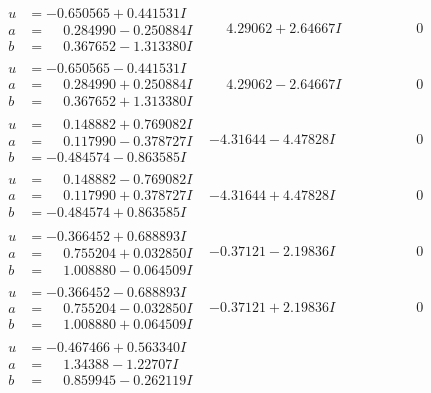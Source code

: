 \documentclass[1p]{elsarticle_modified}
\theoremstyle{definition}
\begin{document}
$$\begin{array}{c|c|c}
\begin{aligned}
u &= -0.650565 + 0.441531 I \\
a &= \phantom{-}0.284990 - 0.250884 I \\
b &= \phantom{-}0.367652 - 1.313380 I\end{aligned}
 & \phantom{-}4.29062 + 2.64667 I & \phantom{-0.000000 } 0 \\ \hline\begin{aligned}
u &= -0.650565 - 0.441531 I \\
a &= \phantom{-}0.284990 + 0.250884 I \\
b &= \phantom{-}0.367652 + 1.313380 I\end{aligned}
 & \phantom{-}4.29062 - 2.64667 I & \phantom{-0.000000 } 0 \\ \hline\begin{aligned}
u &= \phantom{-}0.148882 + 0.769082 I \\
a &= \phantom{-}0.117990 - 0.378727 I \\
b &= -0.484574 - 0.863585 I\end{aligned}
 & -4.31644 - 4.47828 I & \phantom{-0.000000 } 0 \\ \hline\begin{aligned}
u &= \phantom{-}0.148882 - 0.769082 I \\
a &= \phantom{-}0.117990 + 0.378727 I \\
b &= -0.484574 + 0.863585 I\end{aligned}
 & -4.31644 + 4.47828 I & \phantom{-0.000000 } 0 \\ \hline\begin{aligned}
u &= -0.366452 + 0.688893 I \\
a &= \phantom{-}0.755204 + 0.032850 I \\
b &= \phantom{-}1.008880 - 0.064509 I\end{aligned}
 & -0.37121 - 2.19836 I & \phantom{-0.000000 } 0 \\ \hline\begin{aligned}
u &= -0.366452 - 0.688893 I \\
a &= \phantom{-}0.755204 - 0.032850 I \\
b &= \phantom{-}1.008880 + 0.064509 I\end{aligned}
 & -0.37121 + 2.19836 I & \phantom{-0.000000 } 0 \\ \hline\begin{aligned}
u &= -0.467466 + 0.563340 I \\
a &= \phantom{-}1.34388 - 1.22707 I \\
b &= \phantom{-}0.859945 - 0.262119 I\end{aligned}

\end{array}$$
\end{document}
